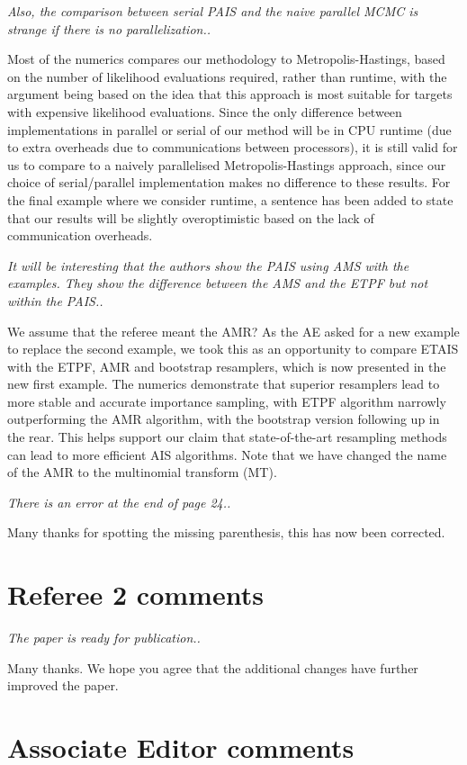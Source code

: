 \documentclass{article}
\newcommand{\comment}[2]{\vspace{0.6cm}{\bf Comment:} {\it #1.}

\vspace{0.3cm}{\bf Answer:} #2}
\begin{document}
\comment{Also, the comparison between serial PAIS and the naive parallel MCMC is strange if there is no parallelization.}{Most of the numerics compares our methodology to Metropolis-Hastings, based on the number of likelihood evaluations required, rather than runtime, with the argument being based on the idea that this approach is most suitable for targets with expensive likelihood evaluations. Since the only difference between implementations in parallel or serial of our method will be in CPU runtime (due to extra overheads due to communications between processors), it is still valid for us to compare to a naively parallelised Metropolis-Hastings approach, since our choice of serial/parallel implementation makes no difference to these results. For the final example where we consider runtime, a sentence has been added to state that our results will be slightly overoptimistic based on the lack of communication overheads.}

\comment{It will be interesting that the authors show the PAIS using AMS with the examples. They show the difference between the AMS and the ETPF but not within the PAIS.}{We assume that the referee meant the AMR? As the AE asked for a new example to replace the second example, we took this as an opportunity to compare ETAIS with the ETPF, AMR and bootstrap resamplers, which is now presented in the new first example. The numerics demonstrate that superior resamplers lead to more stable and accurate importance sampling, with ETPF algorithm narrowly outperforming the AMR algorithm, with the bootstrap version following up in the rear. This helps support our claim that state-of-the-art resampling methods can lead to more efficient AIS algorithms. Note that we have changed the name of the AMR to the multinomial transform (MT).}

\comment{There is an error at the end of page 24.}{Many thanks for spotting the missing parenthesis, this has now been corrected.}

\section*{Referee 2 comments}
\comment{The paper is ready for publication.}{Many thanks. We hope you agree that the additional changes have further improved the paper.}

\section*{Associate Editor comments}
\end{document}
